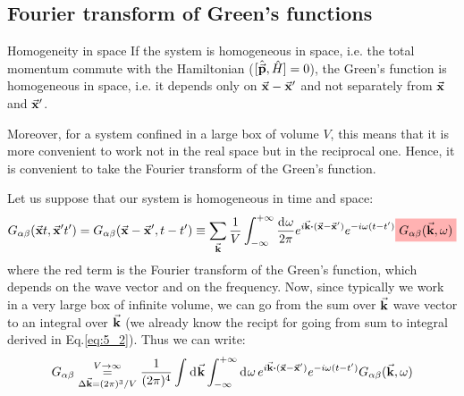 \documentclass[../main/main.tex]{subfiles}
\begin{document}
\subsection{Fourier transform of Green's functions}

\begin{property}{Homogeneity in space}{}
If the system is homogeneous in space, i.e. the total momentum commute with the Hamiltonian (\( [\hat{\va{p}},\hat{H}  ] = 0 \)), the Green's function is homogeneous in space, i.e. it depends only on \( \va{x}-\va{x}' \) and not separately from \( \va{x} \) and \( \va{x}' \).
\label{propty:8_1}
\end{property}

Moreover, for a system confined in a large box of volume \( V \), this means that it is more convenient to work not in the real space but in the reciprocal one. Hence, it is convenient to take the Fourier transform of the Green's function.

Let us suppose that our system is homogeneous in time and space:
\begin{equation}
G_{\alpha \beta }(\va{x}t,\va{x}'t')  =  G_{\alpha \beta }(\va{x}-\va{x}',t-t') \equiv
\sum_{\va{k}}^{} \frac{1}{V} \int_{- \infty }^{+ \infty } \frac{\dd[]{\omega } }{2 \pi } e^{i \va{k}\vdot (\va{x}-\va{x}')} e^{- i \omega (t-t')} \mathcolorbox{red!30}{G_{\alpha \beta } (\va{k},\omega )    }
\label{eq:8_3}
\end{equation}
where the red term is the Fourier transform of the Green's function, which depends on the wave vector and on the frequency.
Now, since typically we work in a very large box of infinite volume, we can go from the sum over \( \va{k} \) wave vector to an integral over \( \va{k} \) (we already know the recipt for going from sum to integral derived in Eq.\eqref{eq:5_2}). Thus we can write:
\begin{equation*}
  G_{\alpha \beta } \overset{V \rightarrow \infty }{ \underset{\Delta \va{k}= (2 \pi )^3/V}{=} }
  \frac{1}{(2 \pi )^4}
  \int_{}^{} \dd[]{\va{k}}
  \int_{-\infty }^{+\infty } \dd[]{\omega }    e^{i \va{k}\vdot (\va{x}-\va{x}')} e^{- i \omega (t-t')} G_{\alpha \beta } (\va{k},\omega )
\end{equation*}
\end{document}
